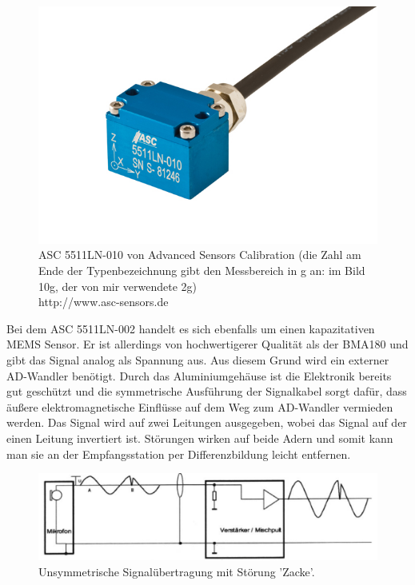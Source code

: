 \documentclass[12pt,a4paper,twoside,BCOR=12.5mm]{scrartcl}
\begin{document}
\begin{figure}[H]
\centering
\includegraphics[scale=.5]{hardwareimages/asc.jpg}
\caption{ASC 5511LN-010 von Advanced Sensors Calibration (die Zahl am Ende der Typenbezeichnung gibt den Messbereich in g an: im Bild 10g, der von mir verwendete 2g)\\http://www.asc-sensors.de}
\label{asc5511}
\end{figure}

Bei dem ASC 5511LN-002 handelt es sich ebenfalls um einen kapazitativen MEMS Sensor. Er ist allerdings von hochwertigerer Qualität als der BMA180 und gibt das Signal analog als Spannung aus. Aus diesem Grund wird ein externer AD-Wandler benötigt.
Durch das Aluminiumgehäuse ist die Elektronik bereits gut geschützt und die symmetrische Ausführung der Signalkabel sorgt dafür, dass äußere elektromagnetische Einflüsse auf dem Weg zum AD-Wandler vermieden werden. Das Signal wird auf zwei Leitungen ausgegeben, wobei das Signal auf der einen Leitung invertiert ist. Störungen wirken auf beide Adern und somit kann man sie an der Empfangsstation per Differenzbildung leicht entfernen. 
\begin{figure}[H]
\centering
\includegraphics[scale=.9]{unsymmetrisch.png}
\caption{Unsymmetrische Signalübertragung mit Störung 'Zacke'. \citep{Sengpiel:2001fk}}
\label{unsymmetrisch}
\end{figure}
\end{document}
